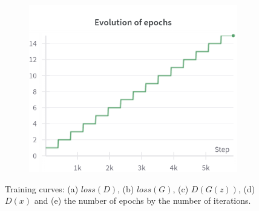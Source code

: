 \begin{figure}[H]
    \begin{subfigure}{0.45\textwidth}
        \centering
        \includegraphics[width=0.95\linewidth]{cifar10/32/epochs.png}
        \caption{}
        \label{subfig:cifar10/32/epochs}
    \end{subfigure}%

    \caption{Training curves: (a) $loss(D)$, (b) $loss(G)$, (c) $D(G(z))$, (d) $D(x)$ and (e) the number of epochs by the number of iterations.}
    \label{fig:cifar10_32_curves}
\end{figure}

